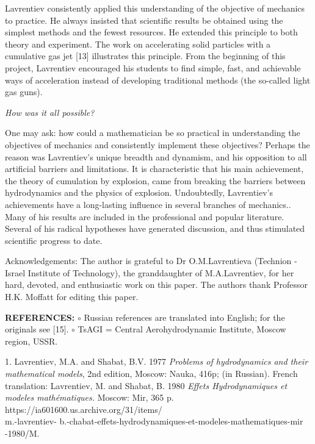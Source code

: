 \documentclass[%
 reprint,
onecolumn,
 amsmath,amssymb, aps,
]{revtex4-2}
\numberwithin{equation}{section}
\begin{document}
Lavrentiev consistently applied this understanding of the objective of mechanics to practice.
He always insisted that scientific results be obtained using the simplest methods and the fewest resources.
He extended this principle to both theory and experiment.
The work on accelerating solid particles with a cumulative gas jet [13] illustrates this principle.
From the beginning of this project, Lavrentiev encouraged his students to find simple, fast, and achievable ways of acceleration instead of developing traditional methods (the so-called light gas guns).
\vspace{3mm}

\textit{How was it all possible?}
\vspace{1mm}

One may ask: how could a mathematician be so practical in understanding the objectives of mechanics and consistently implement these objectives?
Perhaps the reason was Lavrentiev's unique breadth and dynamism, and his opposition to all artificial barriers and limitations.
It is characteristic that his main achievement, the theory of cumulation by explosion, came from breaking the barriers between hydrodynamics and the physics of explosion.
Undoubtedly,  Lavrentiev's achievements have a long-lasting influence in several branches of mechanics..
Many of his results are included in the professional and popular literature.
Several of his radical hypotheses have generated discussion, and thus stimulated scientific progress to date.
\vskip 3mm

Acknowledgements: The author is grateful to Dr O.M.Lavrentieva (Technion - Israel Institute of Technology), the granddaughter of M.A.Lavrentiev, for her hard, devoted, and enthusiastic work on this paper. The authors thank Professor H.K. Moffatt for editing this paper.


\vskip 6mm


\textbf{REFERENCES:}
\vskip 1mm
$\circ$ Russian references are translated into English; for the originals see [15].
\vskip 1mm
$\circ$ TsAGI =  Central Aerohydrodynamic Institute, Moscow region, USSR.
\vskip 2mm

1. Lavrentiev, M.A. and Shabat, B.V. 1977 \textit{Problems of hydrodynamics and their mathematical models}, 2nd edition, Moscow: Nauka, 416p; (in Russian).
French translation: Lavrentiev, M. and Shabat, B. 1980 \textit{Effets Hydrodynamiques et modeles mathématiques.} Moscow: Mir, 365 p. https://ia601600.us.archive.org/31/items/\\m.-lavrentiev-
b.-chabat-effets-hydrodynamiques-et-modeles-mathematiques-mir\\-1980/M.
\end{document}
